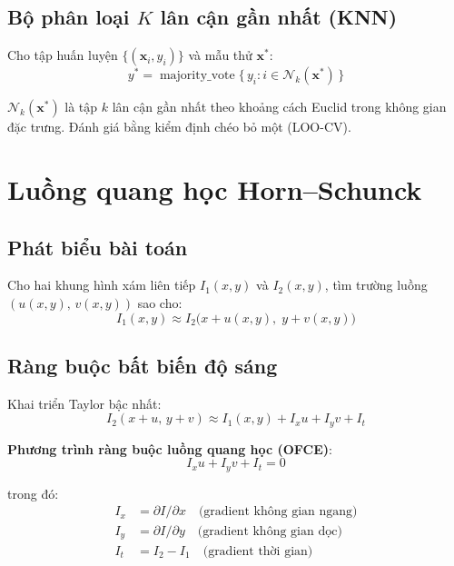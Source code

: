 \documentclass[12pt, a4paper]{article}
\begin{document}
\subsection{Bộ phân loại $K$ lân cận gần nhất (KNN)}

Cho tập huấn luyện $\{(\mathbf{x}_i, y_i)\}$ và mẫu thử $\mathbf{x}^*$:
\begin{equation}
  y^* = \operatorname{majority\_vote}
        \bigl\{\, y_i : i \in \mathcal{N}_k(\mathbf{x}^*) \,\bigr\}
  \label{eq:knn}
\end{equation}

$\mathcal{N}_k(\mathbf{x}^*)$ là tập $k$ lân cận gần nhất theo khoảng
cách Euclid trong không gian đặc trưng. Đánh giá bằng kiểm định chéo
bỏ một (LOO-CV).

\section{Luồng quang học Horn--Schunck}

\subsection{Phát biểu bài toán}

Cho hai khung hình xám liên tiếp $I_1(x,y)$ và $I_2(x,y)$, tìm trường
luồng $(u(x,y),\, v(x,y))$ sao cho:
\begin{equation}
  I_1(x,y) \approx I_2\!\bigl(x + u(x,y),\; y + v(x,y)\bigr)
  \label{eq:of_problem}
\end{equation}

\subsection{Ràng buộc bất biến độ sáng}

Khai triển Taylor bậc nhất:
\begin{equation}
  I_2(x+u,\, y+v) \approx I_1(x,y) + I_x u + I_y v + I_t
  \label{eq:taylor}
\end{equation}

\textbf{Phương trình ràng buộc luồng quang học (OFCE)}:
\begin{equation}
  I_x u + I_y v + I_t = 0
  \label{eq:ofce}
\end{equation}

trong đó:
\begin{align*}
  I_x &= \partial I/\partial x \quad \text{(gradient không gian ngang)} \\
  I_y &= \partial I/\partial y \quad \text{(gradient không gian dọc)} \\
  I_t &= I_2 - I_1 \quad \text{(gradient thời gian)}
\end{align*}
\end{document}

